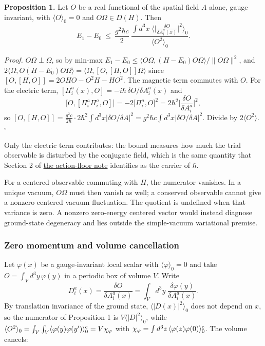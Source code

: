 \documentclass[11pt,a4paper]{article}
\begin{document}
\textbf{Proposition 1.} Let \(O\) be a real functional of the spatial
field \(A\) alone, gauge invariant, with \(\langle O\rangle_0=0\) and
\(O\Omega\in D(H)\). Then \[E_1-E_0\ \le\ \frac{g^2\hbar c}{2}\;
\frac{\displaystyle\int d^3x\;\Big\langle\Big|\frac{\delta O}{\delta A^a_i(x)}\Big|^2\Big\rangle_0}
{\big\langle O^2\big\rangle_0}.\]

\emph{Proof.} \(O\Omega\perp\Omega\), so by min-max
\(E_1-E_0\le\langle O\Omega,(H-E_0)O\Omega\rangle/\|O\Omega\|^2\), and
\(2\langle\Omega,O(H-E_0)O\Omega\rangle=\langle\Omega,[O,[H,O]]\Omega\rangle\)
since \([O,[H,O]]=2OHO-O^2H-HO^2\). The magnetic term commutes with
\(O\). For the electric term,
\([\Pi^a_i(x),O]=-i\hbar\,\delta O/\delta A^a_i(x)\) and
\[\big[O,[\Pi^a_i\Pi^a_i,O]\big]=-2\big[\Pi^a_i,O\big]^2
=2\hbar^2\Big|\frac{\delta O}{\delta A^a_i}\Big|^2,\] so
\([O,[H,O]]=\frac{g^2c}{2\hbar}\cdot2\hbar^2\int d^3x|\delta O/\delta A|^2 =g^2\hbar c\int d^3x|\delta O/\delta A|^2\).
Divide by \(2\langle O^2\rangle\). \(\square\)

Only the electric term contributes: the bound measures how much the
trial observable is disturbed by the conjugate field, which is the same
quantity that Section 2 of
\href{low-dimensional-mass-gap.md\#conditional-orbit-area-bounds-and-state-counting}{the
action-floor note} identifies as the carrier of \(\hbar\).

For a centered observable commuting with \(H\), the numerator vanishes.
In a unique vacuum, \(O\Omega\) must then vanish as well; a conserved
observable cannot give a nonzero centered vacuum fluctuation. The
quotient is undefined when that variance is zero. A nonzero zero-energy
centered vector would instead diagnose ground-state degeneracy and lies
outside the simple-vacuum variational premise.

\hypertarget{zero-momentum-and-volume-cancellation}{%
\subsubsection{Zero momentum and volume
cancellation}\label{zero-momentum-and-volume-cancellation}}

Let \(\varphi(x)\) be a gauge-invariant local scalar with
\(\langle\varphi\rangle_0=0\) and take \(O=\int_Vd^3y\,\varphi(y)\) in a
periodic box of volume \(V\). Write
\[D^a_i(x)=\frac{\delta O}{\delta A^a_i(x)}=\int_Vd^3y\;\frac{\delta\varphi(y)}{\delta A^a_i(x)} .\]
By translation invariance of the ground state,
\(\langle|D(x)|^2\rangle_0\) does not depend on \(x\), so the numerator
of Proposition 1 is \(V\langle|D|^2\rangle_0\), while
\(\langle O^2\rangle_0=\int_V\int_V\langle\varphi(y)\varphi(y')\rangle^{\rm c}_0=V\chi_\varphi\)
with
\(\chi_\varphi=\int d^3z\,\langle\varphi(z)\varphi(0)\rangle^{\rm c}_0\).
The volume cancels:
\end{document}
